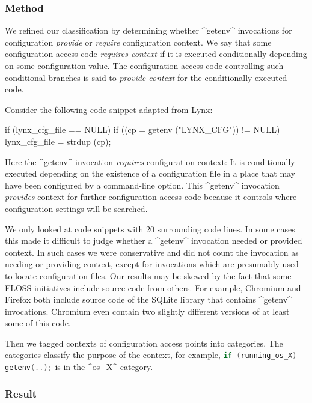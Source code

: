 \subsubsection{Method}

We refined our classification by determining whether ^getenv^ invocations for configuration \emph{provide} or \emph{require} configuration context.
We say that some configuration access code \emph{requires context} if it is executed conditionally depending on some configuration value.
The configuration access code controlling such conditional branches is said to \emph{provide context} for the conditionally executed code.

\begin{example}
Consider the following code snippet adapted from Lynx:

\begin{code}[language=Cpp]
if (lynx_cfg_file == NULL) {
   if ((cp = getenv ("LYNX_CFG")) != NULL)
       lynx_cfg_file = strdup (cp);
}
\end{code}

Here the ^getenv^ invocation \emph{requires} configuration context:
It is conditionally executed depending on the existence of a configuration file in a place that may have been configured by a command-line option.
This ^getenv^ invocation \emph{provides} context for further configuration access code because it controls where configuration settings will be searched.
\end{example}

We only looked at code snippets with 20 surrounding code lines.
In some cases this made it difficult to judge whether a ^getenv^ invocation needed or provided context.
In such cases we were conservative and did not count the invocation as needing or providing context, except for invocations which are presumably used to locate configuration files.
Our results may be skewed by the fact that some FLOSS initiatives include source code from others.
For example, Chromium and Firefox both include source code of the SQLite library that contains ^getenv^ invocations.
Chromium even contain two slightly different versions of at least some of this code.

Then we tagged contexts of configuration access points into categories.
The categories classify the purpose of the context, for example, \lstinline[language=Cpp]^if (running_os_X) getenv(..);^ is in the ^os_X^ category.


\subsubsection{Result}

